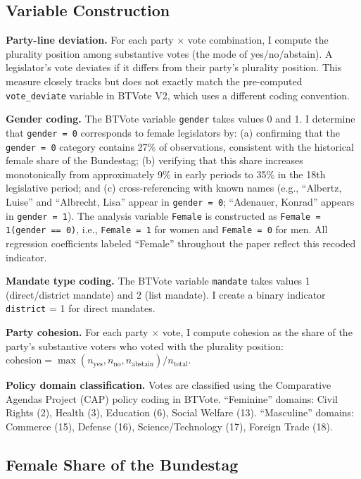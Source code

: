 \documentclass[12pt]{article}
\begin{document}
\subsection{Variable Construction}

\textbf{Party-line deviation.} For each party $\times$ vote combination, I compute the plurality position among substantive votes (the mode of yes/no/abstain). A legislator's vote deviates if it differs from their party's plurality position. This measure closely tracks but does not exactly match the pre-computed \texttt{vote\_deviate} variable in BTVote V2, which uses a different coding convention.

\textbf{Gender coding.} The BTVote variable \texttt{gender} takes values 0 and 1. I determine that \texttt{gender = 0} corresponds to female legislators by: (a) confirming that the \texttt{gender = 0} category contains 27\% of observations, consistent with the historical female share of the Bundestag; (b) verifying that this share increases monotonically from approximately 9\% in early periods to 35\% in the 18th legislative period; and (c) cross-referencing with known names (e.g., ``Albertz, Luise'' and ``Albrecht, Lisa'' appear in \texttt{gender = 0}; ``Adenauer, Konrad'' appears in \texttt{gender = 1}). The analysis variable \texttt{Female} is constructed as \texttt{Female = 1(gender == 0)}, i.e., \texttt{Female = 1} for women and \texttt{Female = 0} for men. All regression coefficients labeled ``Female'' throughout the paper reflect this recoded indicator.

\textbf{Mandate type coding.} The BTVote variable \texttt{mandate} takes values 1 (direct/district mandate) and 2 (list mandate). I create a binary indicator \texttt{district} = 1 for direct mandates.

\textbf{Party cohesion.} For each party $\times$ vote, I compute cohesion as the share of the party's substantive voters who voted with the plurality position: $\text{cohesion} = \max(n_{\text{yes}}, n_{\text{no}}, n_{\text{abstain}}) / n_{\text{total}}$.

\textbf{Policy domain classification.} Votes are classified using the Comparative Agendas Project (CAP) policy coding in BTVote. ``Feminine'' domains: Civil Rights (2), Health (3), Education (6), Social Welfare (13). ``Masculine'' domains: Commerce (15), Defense (16), Science/Technology (17), Foreign Trade (18).

\subsection{Female Share of the Bundestag}
\end{document}
